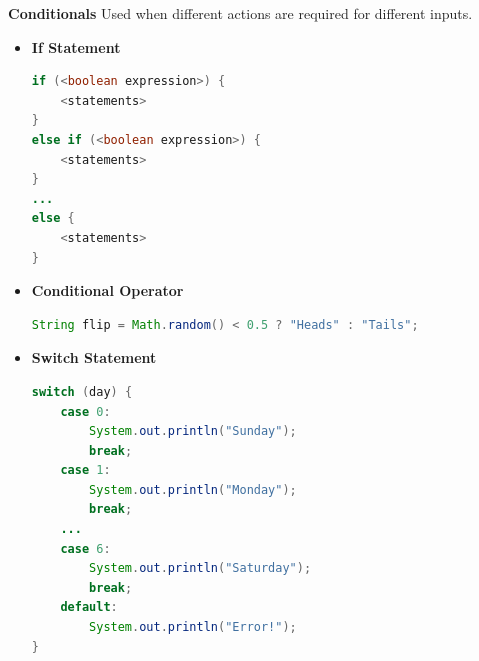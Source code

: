 \documentclass[8pt,a4paper,compress]{beamer}
\begin{document}
\begin{frame}[fragile]
\pause
\textbf{Conditionals} Used when different actions are required for different inputs.

\begin{itemize}
\item \textbf{If Statement}
\begin{lstlisting}[language=Java]
if (<boolean expression>) {
    <statements>
}
else if (<boolean expression>) {
    <statements>
}
...
else {
    <statements>
}
\end{lstlisting}

\pause

\item \textbf{Conditional Operator} 
\begin{lstlisting}[language=Java]
String flip = Math.random() < 0.5 ? "Heads" : "Tails";
\end{lstlisting}

\pause

\item \textbf{Switch Statement} 
\begin{lstlisting}[language=Java]
switch (day) {
    case 0:
        System.out.println("Sunday");
        break;
    case 1:
        System.out.println("Monday");
        break;
    ...
    case 6:
        System.out.println("Saturday");
        break;
    default:
        System.out.println("Error!");
}
\end{lstlisting}

\end{itemize}
\end{frame}
\end{document}
